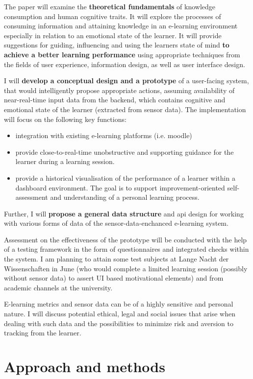 The paper will examine the \textbf{theoretical fundamentals} of knowledge consumption and human cognitive traits. 
It will explore the processes of consuming information and attaining knowledge in an e-learning environment especially in relation to an emotional state of the learner.
It will provide suggestions for guiding, influencing and using the learners state of mind \textbf{to achieve a better learning performance} using appropriate techniques from the fields of user experience, information design, as well as user interface design.

I will \textbf{develop a conceptual design and a prototype} of a user-facing system, that would intelligently propose appropriate actions, assuming availability of near-real-time input data from the backend, which contains cognitive and emotional state of the learner (extracted from sensor data). 
The implementation will focus on the following key functions:
\begin{itemize}
	\item integration with existing e-learning platforms (i.e. moodle)
	\item provide close-to-real-time unobstructive and supporting guidance for the learner during a learning session.
	\item provide a historical visualisation of the performance of a learner within a dashboard environment. The goal is to support improvement-oriented self-assessment and understanding of a personal learning process.
\end{itemize}

Further, I will \textbf{propose a general data structure} and api design for working with various forms of data of the sensor-data-enchanced e-learning system.

Assessment on the effectiveness of the prototype will be conducted with the help of a testing framework in the form of questionnaires and integrated checks within the system. I am planning to attain some test subjects at Lange Nacht der Wissenschaften in June (who would complete a limited learning session (possibly without sensor data) to assert UI based motivational elements) and from academic channels at the university.

E-learning metrics and sensor data can be of a highly sensitive and personal nature.
I will discuss potential ethical, legal and social issues that arise when dealing with such data and the possibilities to minimize risk and aversion to tracking from the learner.

\section{Approach and methods}

